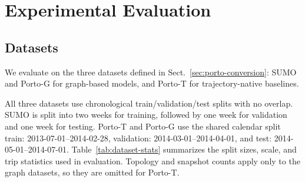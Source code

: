 \section{Experimental Evaluation}\label{sec4}

\subsection{Datasets}\label{sec:porto-dataset}
We evaluate on the three datasets defined in Sect.~\ref{sec:porto-conversion}: SUMO and Porto-G for graph-based models, and Porto-T for trajectory-native baselines.

All three datasets use chronological train/validation/test splits with no overlap. SUMO is split into two weeks for training, followed by one week for validation and one week for testing. Porto-T and Porto-G use the shared calendar split train: 2013-07-01--2014-02-28, validation: 2014-03-01--2014-04-01, and test: 2014-05-01--2014-07-01. Table~\ref{tab:dataset-stats} summarizes the split sizes, scale, and trip statistics used in evaluation. Topology and snapshot counts apply only to the graph datasets, so they are omitted for Porto-T.

